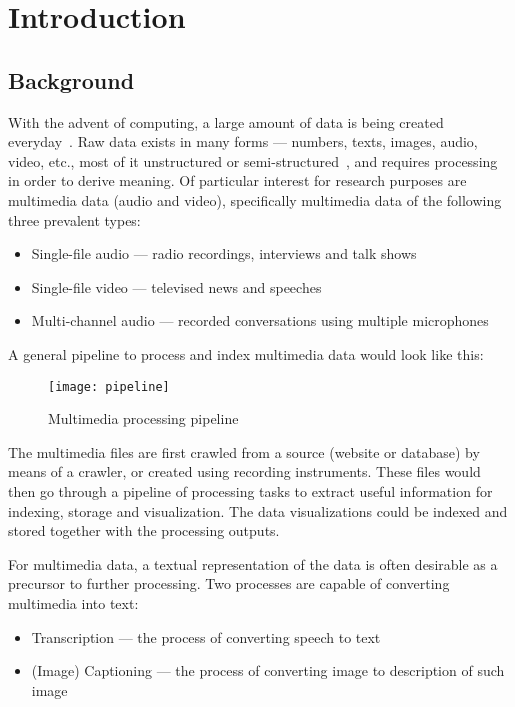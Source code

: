 \chapter{Introduction}

\section{Background}

With the advent of computing, a large amount of data is being created
everyday~\cite{emc}.
Raw data exists in many forms --- numbers, texts, images, audio, video, etc.,
most of it unstructured or semi-structured~\cite{emc},
and requires processing in order to derive meaning. Of particular interest for
research purposes are multimedia data (audio and video), specifically
multimedia data of the following three prevalent types:

\begin{itemize}
    \item Single-file audio --- radio recordings, interviews and talk shows
    \item Single-file video --- televised news and speeches
    \item Multi-channel audio --- recorded conversations using multiple
    microphones
\end{itemize}

A general pipeline to process and index multimedia data would look like this:

\begin{figure}[h]
\begin{center}
    \texttt{[image: pipeline]}
    \caption{Multimedia processing pipeline}
\end{center}
\end{figure}

The multimedia files are first crawled from a source (website or database) by
means of a crawler, or created using recording instruments. These files would
then go through a pipeline of processing tasks to extract useful information
for indexing, storage and visualization. The data visualizations could be
indexed and stored together with the processing outputs. 

For multimedia data, a textual representation of the data is often desirable
as a precursor to further processing. Two processes are capable of converting
multimedia into text:

\begin{itemize}
    \item Transcription --- the process of converting speech to
    text~\cite{transcribe-mw}
    \item (Image) Captioning --- the process of converting image to
    description of such image~\cite{caption}
\end{itemize}

